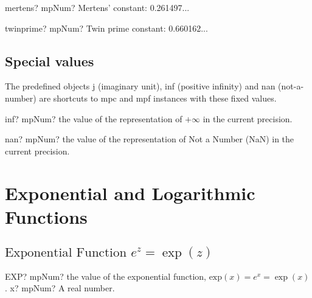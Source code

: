 \vspace{0.6cm}

\begin{mpFunctionsExtract}
	\mpFunctionZero
	{mertens? mpNum?  Mertens' constant: 0.261497...}
\end{mpFunctionsExtract}


\vspace{0.6cm}

\begin{mpFunctionsExtract}
	\mpFunctionZero
	{twinprime? mpNum?  Twin prime constant: 0.660162...}
\end{mpFunctionsExtract}


\subsection{Special values}

The predefined objects j (imaginary unit), inf (positive infinity) and nan (not-a-number) are shortcuts to mpc and mpf instances with these fixed values.

\begin{mpFunctionsExtract}
	\mpFunctionZero
	{inf? mpNum? the value of the representation of  $+\infty$ in the current precision.}
\end{mpFunctionsExtract}

\vspace{0.6cm}


\begin{mpFunctionsExtract}
	\mpFunctionZero
	{nan? mpNum? the value of the representation of Not a Number (NaN) in the current precision.}
\end{mpFunctionsExtract}



\newpage
\section{Exponential and Logarithmic Functions}
\label{ExponentialAndLogarithmCplx}


\subsection{\texorpdfstring{$\text{Exponential Function }e^z = \exp(z)$}{exp}}

\begin{mpFunctionsExtract}
	\mpWorksheetFunctionOneNotImplemented
	{EXP? mpNum? the value of the exponential function, $\text{exp}(x) = e^x = \exp(x)$.}
	{x? mpNum? A real number.}
\end{mpFunctionsExtract}


